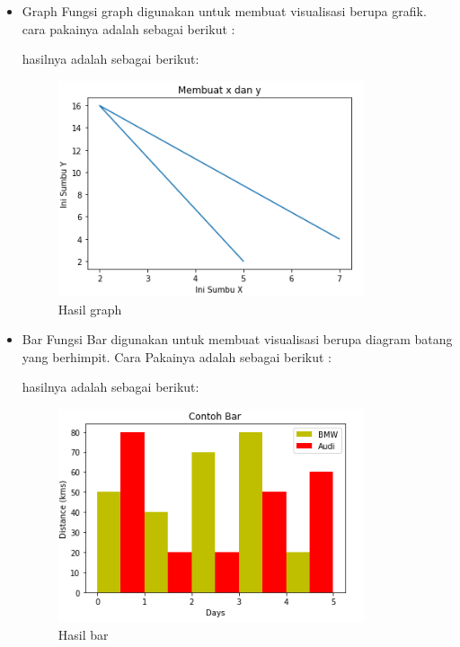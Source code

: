 \begin{itemize}
    \item Graph
    \linebreak
    Fungsi graph digunakan untuk membuat visualisasi berupa grafik.
    cara pakainya adalah sebagai berikut :
    
    hasilnya adalah sebagai berikut:
    \begin{figure}[H]
        \includegraphics[width=9cm]{figures/6/Teori/1174004/3graph.png}
        \caption{Hasil graph}
        \centering
    \end{figure}

    \item Bar
    \linebreak 
    Fungsi Bar digunakan untuk membuat visualisasi berupa diagram batang yang berhimpit.
    Cara Pakainya adalah sebagai berikut :
    
    hasilnya adalah sebagai berikut:
    \begin{figure}[H]
        \includegraphics[width=9cm]{figures/6/Teori/1174004/3bar.png}
        \caption{Hasil bar}
        \centering
    \end{figure}


\end{itemize}
